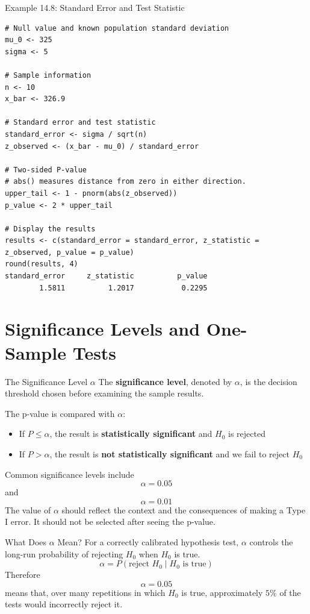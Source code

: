 \documentclass[aspectratio=169]{beamer}
\begin{document}
\begin{frame}[fragile]{Example 14.8: Standard Error and Test Statistic}
\scriptsize
\begin{verbatim}
# Null value and known population standard deviation
mu_0 <- 325
sigma <- 5

# Sample information
n <- 10
x_bar <- 326.9

# Standard error and test statistic
standard_error <- sigma / sqrt(n)
z_observed <- (x_bar - mu_0) / standard_error

# Two-sided P-value
# abs() measures distance from zero in either direction.
upper_tail <- 1 - pnorm(abs(z_observed))
p_value <- 2 * upper_tail

# Display the results
results <- c(standard_error = standard_error, z_statistic = z_observed, p_value = p_value)
round(results, 4)
standard_error     z_statistic          p_value
        1.5811          1.2017           0.2295
\end{verbatim}
\end{frame}

\section{Significance Levels and One-Sample Tests}

\begin{frame}{The Significance Level $\alpha$}
The \textbf{significance level}, denoted by $\alpha$, is the decision threshold chosen before examining the sample results.

\vspace{0.2cm}

The p-value is compared with $\alpha$:
\begin{itemize}
	\item If $P\leq\alpha$, the result is \textbf{statistically significant} and $H_0$ is rejected
  	\item If $P>\alpha$, the result is \textbf{not statistically significant} and we fail to reject $H_0$
\end{itemize}
Common significance levels include
$$\alpha=0.05$$
and
$$\alpha=0.01$$
The value of $\alpha$ should reflect the context and the consequences of making a Type I error. It should not be selected after seeing the p-value.
\end{frame}

\begin{frame}{What Does $\alpha$ Mean?}
For a correctly calibrated hypothesis test, $\alpha$ controls the long-run probability of rejecting $H_0$ when $H_0$ is true.
$$\alpha=P(\text{reject }H_0\mid H_0\text{ is true})$$
Therefore
$$\alpha=0.05$$
means that, over many repetitions in which $H_0$ is true, approximately $5\%$ of the tests would incorrectly reject it.
\end{frame}
\end{document}
